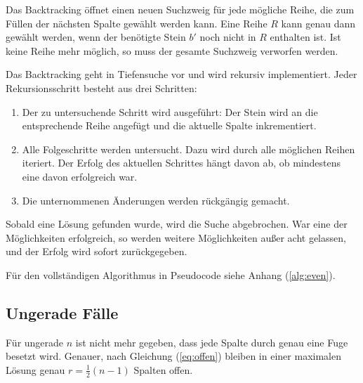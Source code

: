 \documentclass[a4paper, 12pt]{scrartcl}
\numberwithin{equation}{section}
\begin{document}
Das Backtracking öffnet einen neuen Suchzweig für jede mögliche Reihe, die zum Füllen der nächsten Spalte gewählt werden kann. Eine Reihe $R$ kann genau dann gewählt werden, wenn der benötigte Stein $b'$ noch nicht in $R$ enthalten ist. Ist keine Reihe mehr möglich, so muss der gesamte Suchzweig verworfen werden.

Das Backtracking geht in Tiefensuche vor und wird rekursiv implementiert. Jeder Rekursionsschritt besteht aus drei Schritten:
\renewcommand{\labelenumi}{(\arabic{enumi})}
\begin{enumerate}
	\item Der zu untersuchende Schritt wird ausgeführt: Der Stein wird an die entsprechende Reihe angefügt und die aktuelle Spalte inkrementiert.
	\item Alle Folgeschritte werden untersucht. Dazu wird durch alle möglichen Reihen iteriert. Der Erfolg des aktuellen Schrittes hängt davon ab, ob mindestens eine davon erfolgreich war.
	\item Die unternommenen Änderungen werden rückgängig gemacht.
\end{enumerate}
Sobald eine Lösung gefunden wurde, wird die Suche abgebrochen. War eine der Möglichkeiten erfolgreich, so werden weitere Möglichkeiten außer acht gelassen, und der Erfolg wird sofort zurückgegeben.

Für den vollständigen Algorithmus in Pseudocode siehe Anhang (\ref{alg:even}).

\subsection{Ungerade Fälle}
Für ungerade $n$ ist nicht mehr gegeben, dass jede Spalte durch genau eine Fuge besetzt wird. Genauer, nach Gleichung (\ref{eq:offen}) bleiben in einer maximalen Lösung genau $r = \frac{1}{2}(n-1)$ Spalten offen.
\end{document}
